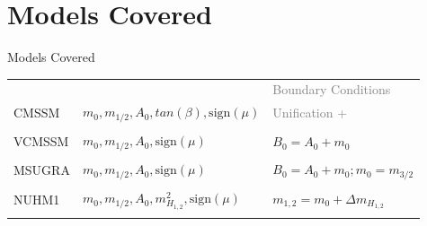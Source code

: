 \documentclass{beamer}
\begin{document}
\section{Models Covered}
\begin{frame}{Models Covered}
  \begin{tabular}{ l l l }
    & & \textcolor{gray}{Boundary Conditions}\\
    \alert{CMSSM}  & $m_{0},m_{1/2},A_{0},tan(\beta),\textrm{sign}(\mu)$  & 
    \textcolor{gray}{Unification + } \\ \\ 
    VCMSSM & $m_{0},m_{1/2},A_{0},\textrm{sign}(\mu)$ & $B_{0}=A_{0}+m_{0}$  \\
    \\
    \alert{MSUGRA} & $m_{0},m_{1/2},A_{0},\textrm{sign}(\mu)$ & $B_{0}=A_{0}+m_{0};
    m_{0}=m_{3/2}$  \\ \\
    NUHM1  & $m_{0},m_{1/2},A_{0},m_{H_{1,2}}^{2},\textrm{sign}(\mu)$ & $m_{1,2} =
    m_{0} + \Delta m_{H_{1,2}}$  \\ \\
  \end{tabular}
\end{frame}
\end{document}
